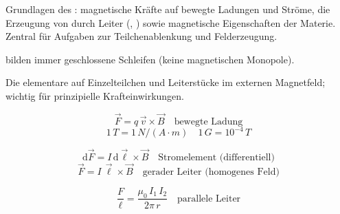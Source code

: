 

\begin{runintext}
Grundlagen des : magnetische Kräfte auf bewegte Ladungen und Ströme, die Erzeugung von  durch Leiter (, ) sowie magnetische Eigenschaften der Materie. Zentral für Aufgaben zur Teilchenablenkung und Felderzeugung.
\end{runintext}
\begin{runintext}
 bilden immer geschlossene Schleifen (keine magnetischen Monopole).
\end{runintext}

\begin{runintext}
Die elementare  auf Einzelteilchen und Leiterstücke im externen Magnetfeld; wichtig für prinzipielle Krafteinwirkungen.
\end{runintext}


\begin{formulabox}
\[ \vec{F} = q\,\vec{v}\times\vec{B} \quad \text{bewegte Ladung} \]
\[ 1\,\si{T} = 1\,\si{N}/(\si{A}\cdot\si{m}) \quad 1\,\si{G} = 10^{-4}\,\si{T} \]
\end{formulabox}

\begin{formulabox}
\[ \mathrm{d}\vec{F} = I\,\mathrm{d}\vec{\ell}\times\vec{B} \quad \text{Stromelement (differentiell)} \]
\[ \vec{F} = I\,\vec{\ell}\times\vec{B} \quad \text{gerader Leiter (homogenes Feld)} \]
\end{formulabox}

\begin{formulabox}
\[ \frac{F}{\ell} = \frac{\mu_0\,I_1\,I_2}{2\pi\,r} \quad \text{parallele Leiter} \]
\end{formulabox}

